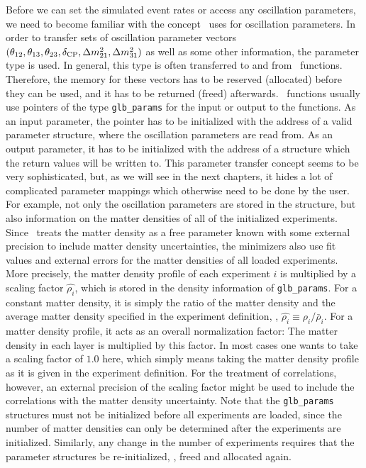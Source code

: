 Before we can set the simulated event rates or access any oscillation
parameters, we need to become familiar with the concept \GLOBES\ uses
for oscillation parameters. In order to transfer sets of oscillation
parameter vectors $(\theta_{12}, \theta_{13}, \theta_{23}, \delta_{\mathrm{CP}}, \Delta m_{21}^2, \Delta m_{31}^2)$
as well as some other information, the parameter type  is used. In general,
 this type is often
transferred to and from \GLOBES\ functions. Therefore, the memory 
for these vectors has to be reserved (allocated) before they can be used, 
and it has to be returned (freed) afterwards.
\GLOBES\ functions usually use pointers
of the type {\tt glb\_params} for the input or output to the functions.
As an input parameter, the pointer has to be initialized with the address of a valid
parameter structure, where the oscillation parameters are read from. As
an output parameter, it has to be initialized with the address of
a structure which the return values will be written to.
This parameter transfer concept seems to be very sophisticated, but, as we
will see in the next chapters, it hides a lot of complicated parameter 
mappings which otherwise need to be done by the user. For example, not
only the oscillation parameters are stored in the  structure, but also information on the matter
densities of all of the initialized experiments. Since \GLOBES\ treats
the matter density as a free parameter known with some external precision
to include matter density uncertainties,
the minimizers also use fit values and external errors for the matter
densities of all loaded experiments. More precisely, the matter density
profile of each experiment $i$ is multiplied by a scaling factor
$\hat{\rho_i}$, 
which is stored in the density information of {\tt glb\_params}.
For a constant matter density, it is simply the ratio of the matter density and the average matter density specified in the experiment definition, \ie , $\hat{\rho_i} \equiv \rho_i/\bar{\rho}_i$. For a matter density profile, it acts as an overall normalization factor: The matter density in each layer is multiplied by this factor. In most cases one wants to take a scaling factor of $1.0$ here, which simply means taking the matter density profile as it is given in the experiment definition. For the treatment of correlations, however,
an external precision of the scaling factor might be used to include the
correlations with the matter density uncertainty.
Note that the {\tt glb\_params}
structures must not be initialized before all experiments are loaded,
since the number of matter densities can only be determined after the
experiments are initialized. 
Similarly, any change in the number of experiments requires that the
parameter structures be re-initialized, \ie, freed and allocated again.



